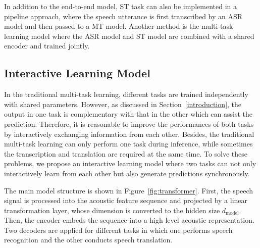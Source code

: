 \documentclass[letterpaper]{article} %
\begin{document}
In addition to the end-to-end model, ST task can also be implemented in a pipeline approach, where the speech utterance is first transcribed by an ASR model and then passed to a MT model. Another method is the multi-task learning model where the ASR model and ST model are combined with a shared encoder and trained jointly. 

\subsection{Interactive Learning Model}
In the traditional multi-task learning, different tasks are trained independently with shared parameters. However, as discussed in Section~\ref{introduction}, the output in one task is complementary with that in the other which can assist the prediction. Therefore, it is reasonable to improve the performances of both tasks by interactively exchanging information from each other. Besides, the traditional multi-task learning can only perform one task during inference, while sometimes the transcription and translation are required at the same time. To solve these problems, we propose an interactive learning model where two tasks can not only interactively learn from each other but also generate predictions synchronously.

The main model structure is shown in Figure~\ref{fig:transformer}. First, the speech signal is processed into the acoustic feature sequence and projected by a linear transformation layer, whose dimension is converted to the hidden size $d_{\textrm{model}}$. Then, the encoder embeds the sequence into a high level acoustic representation. Two decoders are applied for different tasks in which one performs speech recognition and the other conducts speech translation. 
\end{document}
